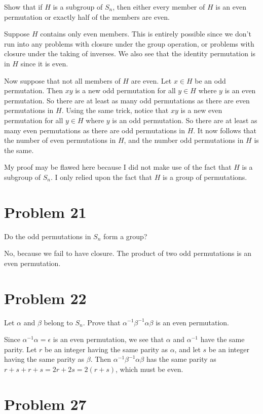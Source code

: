 \documentclass{article}
\begin{document}
Show that if $H$ is a subgroup of $S_n$, then either every member of $H$ is an
even permutation or exactly half of the members are even.

Suppose $H$ contains only even members.  This is entirely possible since
we don't run into any problems with closure under the group operation,
or problems with closure under the taking of inverses.  We also see that
the identity permutation is in $H$ since it is even.

Now suppose that not all members of $H$ are even.  Let $x\in H$ be an
odd permutation.  Then $xy$ is a new odd permutation for all $y\in H$ where
$y$ is an even permutation.  So there are at least as many odd permutations
as there are even permutations in $H$.  Using the same trick, notice that
$xy$ is a new even permutation for all $y\in H$ where $y$ is an odd permutation.
So there are at least as many even permutations as there are odd permutations in $H$.
It now follows that the number of even permutations in $H$,
and the number odd permutations in $H$ is the same.

My proof may be flawed here because I did not make use of the fact that
$H$ is a subgroup of $S_n$.  I only relied upon the fact that $H$ is a
group of permutations.

\section*{Problem 21}

Do the odd permutations in $S_n$ form a group?

No, because we fail to have closure.  The product of two odd permutations is an even permutation.

\section*{Problem 22}

Let $\alpha$ and $\beta$ belong to $S_n$.  Prove that $\alpha^{-1}\beta^{-1}\alpha\beta$
is an even permutation.

Since $\alpha^{-1}\alpha=\epsilon$ is an even permutation, we see that $\alpha$ and
$\alpha^{-1}$ have the same parity.  Let $r$ be an integer having the same parity
as $\alpha$, and let $s$ be an integer having the same parity as $\beta$.
Then $\alpha^{-1}\beta^{-1}\alpha\beta$ has the same parity as
$r+s+r+s = 2r+2s = 2(r+s)$, which must be even.

\section*{Problem 27}
\end{document}
